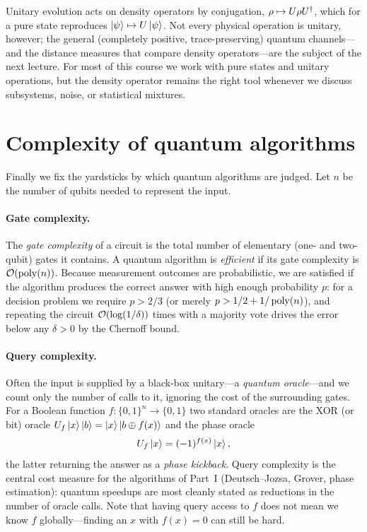 Unitary evolution acts on density operators by conjugation,
$\rho\mapsto U\rho U^{\dagger}$, which for a pure state reproduces
$\ket{\psi}\mapsto U\ket{\psi}$. Not every physical operation is unitary, however;
the general (completely positive, trace-preserving) quantum channels---and the
distance measures that compare density operators---are the subject of the next
lecture. For most of this course we work with pure states and unitary operations,
but the density operator remains the right tool whenever we discuss subsystems,
noise, or statistical mixtures.

\section{Complexity of quantum algorithms}
\label{sec:lec01-6}

Finally we fix the yardsticks by which quantum algorithms are judged. Let $n$ be the
number of qubits needed to represent the input.

\paragraph{Gate complexity.} The \emph{gate complexity} of a circuit is the total
number of elementary (one- and two-qubit) gates it contains. A quantum algorithm is
\emph{efficient} if its gate complexity is $\mathcal{O}(\operatorname{poly}(n))$. Because measurement
outcomes are probabilistic, we are satisfied if the algorithm produces the correct
answer with high enough probability $p$: for a decision problem we require $p>2/3$
(or merely $p>1/2+1/\operatorname{poly}(n)$), and repeating the circuit $\mathcal{O}(\log(1/\delta))$
times with a majority vote drives the error below any $\delta>0$ by the Chernoff
bound.

\paragraph{Query complexity.} Often the input is supplied by a black-box unitary---a
\emph{quantum oracle}---and we count only the number of calls to it, ignoring the
cost of the surrounding gates. For a Boolean function $f:\{0,1\}^{n}\to\{0,1\}$ two
standard oracles are the XOR (or bit) oracle $U_{f}\ket{x}\ket{b}=\ket{x}\ket{b\oplus f(x)}$
and the phase oracle
\begin{equation}
  U_{f}\ket{x}=(-1)^{f(x)}\ket{x},
\end{equation}
the latter returning the answer as a \emph{phase kickback}. Query complexity is the
central cost measure for the algorithms of Part~I (Deutsch--Jozsa, Grover, phase
estimation): quantum speedups are most cleanly stated as reductions in the number of
oracle calls. Note that having query access to $f$ does not mean we know $f$
globally---finding an $x$ with $f(x)=0$ can still be hard.

